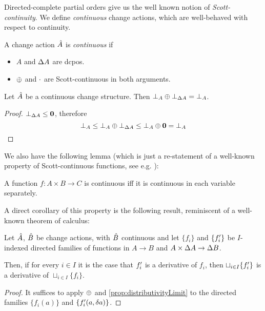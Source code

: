 Directed-complete partial orders give us the well known notion of
\emph{Scott-continuity}. We define \emph{continuous} change actions,
which are well-behaved with respect to continuity.

\begin{defn}
  A change action $\hat{A}$ is \emph{continuous} if
  \begin{itemize}
    \item $A$ and $\Delta A$ are dcpos.
    \item $\oplus$ and $\cdot$ are Scott-continuous in both arguments.
  \end{itemize}
\end{defn}

\begin{corollary}
  \label{cor:bottomPlusBottom}
  Let $\hat{A}$ be a continuous change structure. Then $\bot_A \oplus
  \bot_{\Delta A} = \bot_A$.
\end{corollary}
\ifproofs
\begin{proof}
  $\bot_{\Delta A} \leq \textbf{0}$, therefore
  \begin{displaymath}
    \bot_A \leq \bot_A \oplus \bot_{\Delta A} \leq \bot_A \oplus \textbf{0} = \bot_A
  \end{displaymath}
\end{proof}
\fi

We also have the following lemma (which is just a re-statement of a well-known
property of Scott-continuous functions, see e.g. \cite[Lemma~3.2.6]{abramsky1994domain}):

\begin{prop}
  \label{prop:distributivityLimit}
  A function $f : A \times B \rightarrow C$ is continuous iff it is continuous in each variable separately.
\end{prop}

A direct corollary of this property is the following result, reminiscent of a well-known theorem of calculus:

\begin{corollary}
  \label{cor:diffContinuous}
  Let $\hat{A}$, $\hat{B}$ be change actions, with $\hat{B}$ continuous and let $\{f_i\}$ and $\{f_i'\}$ be
  $I$-indexed directed families of functions in $A \rightarrow B$ and $A \times \Delta A \rightarrow \Delta B$.

  Then, if for every $i \in I$ it is the case that $f_i'$ is a derivative of $f_i$, then $\sqcup_{i \in I} \{ f_i' \}$ is
  a derivative of $\sqcup_{i \in I} \{ f_i \}$.
\end{corollary}
\ifproofs
\begin{proof}
  It suffices to apply $\oplus$ and \cref{prop:distributivityLimit} to the directed families $\{ f_i(a) \}$ and
  $\{ f_i'(a, \delta a) \}$.
\end{proof}
\fi

